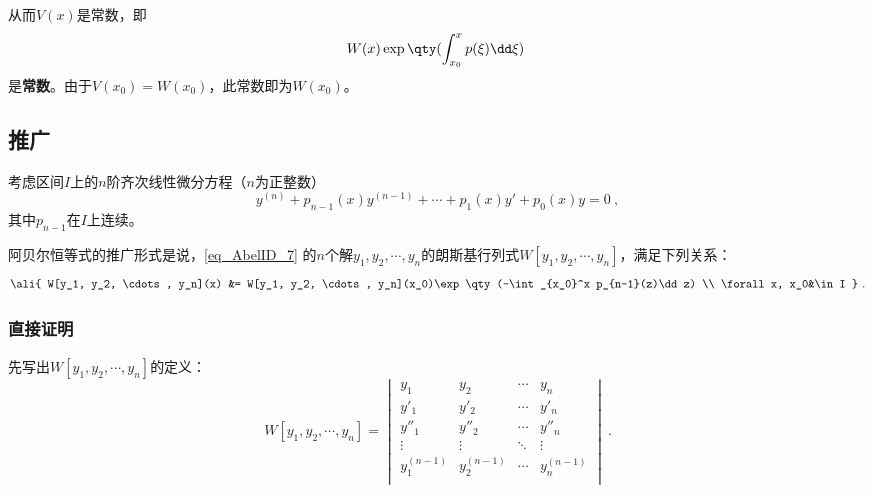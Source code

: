 从而$V(x)$是常数，即
\begin{equation}
W(x)\exp\qty(\int_{x_0}^x p(\xi)\dd \xi)~
\end{equation}
是\textbf{常数}。由于$V(x_0)=W(x_0)$，此常数即为$W(x_0)$。


\subsection{推广}

考虑区间$I$上的$n$阶齐次线性微分方程（$n$为正整数）
\begin{equation}\label{eq_AbelID_7}
y^{(n)} + p_{n-1}(x)y^{(n-1)} + \cdots + p_1(x)y' + p_0(x)y = 0~,
\end{equation}
其中$p_{n-1}$在$I$上连续。

阿贝尔恒等式的推广形式是说，\autoref{eq_AbelID_7} 的$n$个解$y_1, y_2, \cdots, y_n$的朗斯基行列式$W[y_1, y_2, \cdots, y_n]$，满足下列关系：
\begin{equation}
\ali{
W[y_1, y_2, \cdots, y_n](x) &= W[y_1, y_2, \cdots, y_n](x_0)\exp\qty(-\int_{x_0}^x p_{n-1}(z)\dd z) \\
\forall x, x_0&\in I
}~.
\end{equation}




\subsubsection{直接证明}

先写出$W[y_1, y_2, \cdots, y_n]$的定义：
\begin{equation}
W[y_1, y_2, \cdots, y_n] = 
\begin{vmatrix}
y_1&y_2&\cdots&y_n\\
y'_1&y'_2&\cdots&y'_n\\
y''_1&y''_2&\cdots&y''_n\\
\vdots&\vdots&\ddots&\vdots\\
y_1^{(n-1)}&y_2^{(n-1)}&\cdots&y_n^{(n-1)}\\
\end{vmatrix}~.
\end{equation}

